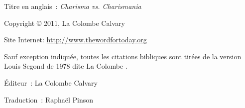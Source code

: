 \newpage
\mbox{}
\vfill
\noindent Titre en anglais~: \emph{Charisma vs. Charismania}

\noindent Copyright \copyright{} 2011, La Colombe Calvary


\noindent \ccbyncnd

\noindent Site Internet: \url{http://www.thewordfortoday.org}

\noindent Sauf exception indiquée, toutes les citations bibliques sont
 tirées de la version Louis Segond de 1978 dite \og La Colombe \fg{}.

\noindent Éditeur~: La Colombe Calvary

\noindent Traduction~: Raphaël Pinson

